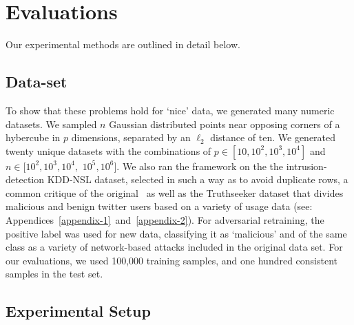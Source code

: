 \documentclass[fonts]{icst}
\begin{document}
\section{Evaluations}
Our experimental methods are outlined in detail below.
\subsection{Data-set}
To show that these problems hold for `nice' data, we generated many numeric datasets. We sampled $n$ Gaussian distributed points near opposing corners of a hybercube in $p$ dimensions, separated by an $\ell_2$ distance of ten. We generated twenty unique datasets with the combinations of $p \in [10, 10^{2}, 10^{3}, 10^{4}]$ and $n \in [10^2, 10^3, 10^4,$ $10^5, 10^6]$. We also ran the framework on the the intrusion-detection KDD-NSL dataset\cite{kdd-nsl}, selected in such a way as to avoid duplicate rows, a common critique of the original~\cite{Dua:2019} as well as the Truthseeker dataset\cite{truthseeker} that divides malicious and benign twitter users based on a variety of usage data (see: Appendices~\ref{appendix-1}~and~\ref{appendix-2}). For adversarial retraining, the positive label was used for new data, classifying it as `malicious' and of the same class as a variety of network-based attacks included in the original data set. For our evaluations, we used 100,000 training samples, and one hundred consistent samples in the test set. 




\subsection{Experimental Setup}
\end{document}

